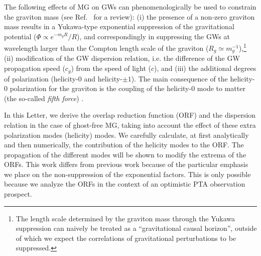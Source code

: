 \documentclass[prd,twocolumn,aps,psfig,nofootinbib,nobibnotes,superscriptaddress,preprintnumbers,times]{revtex4-2}
\begin{document}
The following effects of MG on GWs can phenomenologically be used to constrain the graviton mass (see Ref.\ \cite{deRham:2016nuf} for a review):
(i) the presence of a non-zero graviton mass results in a Yukawa-type exponential suppression of the gravitational potential ($\Phi \propto e^{-m_gR}/R$), and correspondingly in suppressing the GWs at wavelength larger than the Compton length scale of the graviton ($R_g \simeq m_g^{-1}$),\footnote{The length scale determined by the graviton mass through the Yukawa suppression can naively be treated as a ``gravitational causal horizon'', outside of which we expect the correlations of gravitational perturbations to be suppressed.}
(ii) modification of the GW dispersion relation, i.e. the difference of the GW propagation speed ($c_g$) from the speed of light ($c$), and
(iii) the additional degrees of polarization (helicity-$0$ and helicity-$\pm 1$). The main consequence of the helicity-$0$ polarization for the graviton is the coupling of the helicity-0 mode to matter (the so-called {\it fifth force}) \cite{deRham:2014naa}.%

In this Letter, we derive the overlap reduction function (ORF) and the dispersion relation in the case of ghost-free MG, taking into account the effect of these extra polarization modes (helicity) modes. We carefully calculate, at first analytically and then numerically, the contribution of the helicity modes to the ORF. The propagation of the different modes will be shown to modify the extrema of the ORFs.
This work differs from previous work \cite{Liang:2021bct, Anholm:2008wy, Arjona:2024cex, Lee:2013awh} because of the particular emphasis we place on the non-suppression of the exponential factors. This is only possible because we analyze the ORFs in the context of an optimistic PTA observation prospect.

\end{document}
